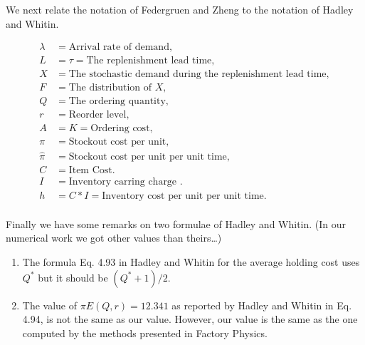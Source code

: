 \documentclass{article}
\newcommand{\1}[1]{\mathbb{1}_{#1}}
\begin{document}
We next relate the notation of Federgruen and Zheng to the
notation of Hadley and Whitin.

\begin{align*}
     \lambda &= \text{Arrival rate of demand}, \\
     L &= \tau = \text{The replenishment lead time}, \\
     X &= \text{The stochastic demand during the replenishment lead time}, \\
     F &= \text{The distribution of } X,\\
     Q &= \text{The ordering quantity}, \\
     r &= \text{Reorder level}, \\
     A & = K = \text{Ordering cost},\\
     \pi & = \text{Stockout cost per unit},\\
     \hat \pi & = \text{Stockout cost per unit per unit time},\\
     C &= \text{Item Cost}. \\
     I &= \text{Inventory carring charge }. \\
     h &= C*I = \text{Inventory cost per unit per unit time}. \\
\end{align*}


Finally we have some remarks on two formulae of Hadley and Whitin. (In
our numerical work we got other values than theirs\ldots)
\begin{enumerate}
\item The formula Eq. 4.93 in Hadley and Whitin for the average
  holding cost uses $Q^*$ but it should be $(Q^*+1)/2$. 
\item The value of $\pi E(Q,r) = 12.341$ as reported by Hadley and
  Whitin in Eq. 4.94, is not the same as our value. However, our value
  is the same as the one computed by the methods presented in Factory
  Physics.
\end{enumerate}
\end{document}
